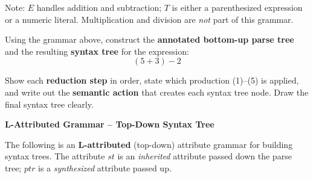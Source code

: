 \documentclass[12pt]{exam}
\begin{document}
\begin{questions}
\medskip
\noindent Note: $E$ handles addition and subtraction; $T$ is either a
parenthesized expression or a numeric literal.
Multiplication and division are \emph{not} part of this grammar.

\medskip
\noindent Using the grammar above, construct the \textbf{annotated bottom-up parse
tree} and the resulting \textbf{syntax tree} for the expression:
\[
  (5 + 3) - 2
\]

\medskip
\noindent Show each \textbf{reduction step} in order, state which production
(1)--(5) is applied, and write out the \textbf{semantic action} that creates
each syntax tree node. Draw the final syntax tree clearly.

\vspace{12cm}

\newpage

\question[15]
\textbf{L-Attributed Grammar -- Top-Down Syntax Tree}

\medskip
\noindent The following is an \textbf{L-attributed} (top-down) attribute grammar
for building syntax trees.  The attribute $\mathit{st}$ is an
\emph{inherited} attribute passed down the parse tree; $\mathit{ptr}$ is a
\emph{synthesized} attribute passed up.


\end{questions}
\end{document}
